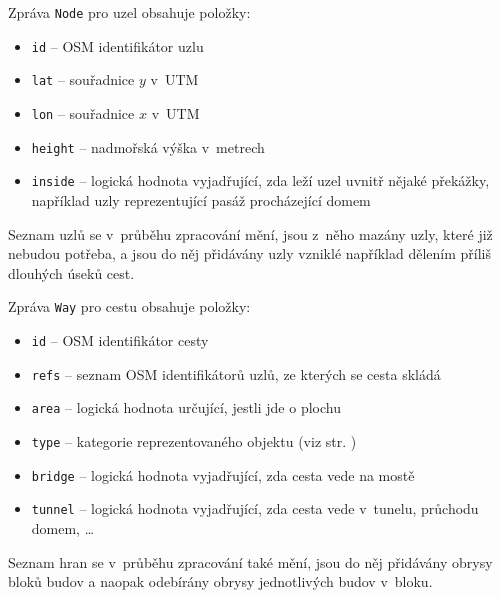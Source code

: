 Zpráva \verb|Node| pro uzel obsahuje položky:
\begin{itemize}
	\item \verb|id| -- OSM identifikátor uzlu
	\item \verb|lat| -- souřadnice $y$ v~UTM
	\item \verb|lon| -- souřadnice $x$ v~UTM
	\item \verb|height| -- nadmořská výška v~metrech
	\item \verb|inside| -- logická hodnota vyjadřující, zda leží uzel uvnitř
	nějaké překážky, například uzly reprezentující pasáž procházející domem
\end{itemize}
Seznam uzlů se v~průběhu zpracování mění, jsou z~něho mazány uzly, které již
nebudou potřeba, a jsou do něj přidávány uzly vzniklé například dělením příliš
dlouhých úseků cest.

Zpráva \verb|Way| pro cestu obsahuje položky:
\begin{itemize}
	\item \verb|id| -- OSM identifikátor cesty
	\item \verb|refs| -- seznam OSM identifikátorů uzlů, ze kterých se cesta
	skládá
	\item \verb|area| -- logická hodnota určující, jestli jde o plochu
	\item \verb|type| -- kategorie reprezentovaného objektu (viz str. 
	\pageref{label:kategorie})
	\item \verb|bridge| -- logická hodnota vyjadřující, zda cesta vede na mostě
	\item \verb|tunnel| -- logická hodnota vyjadřující, zda cesta vede
v~tunelu, průchodu domem, \dots
\end{itemize}
Seznam hran se v~průběhu zpracování také mění, jsou do něj přidávány obrysy
bloků budov a naopak odebírány obrysy jednotlivých budov v~bloku.

